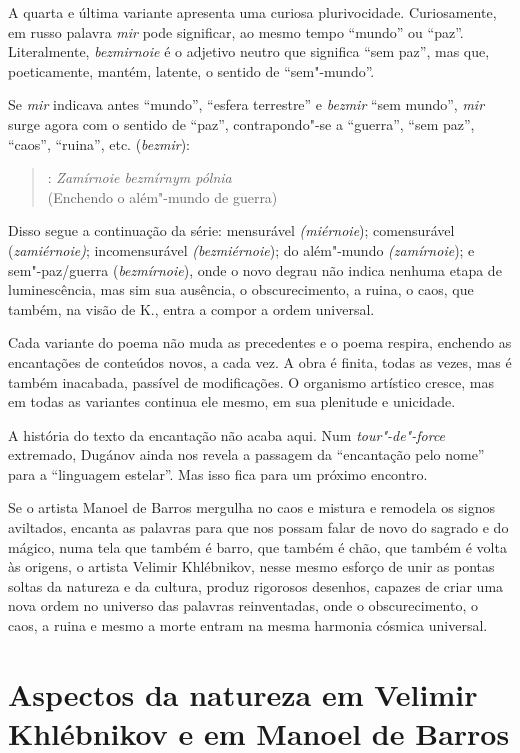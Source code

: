 A quarta e última variante apresenta uma curiosa plurivocidade.
Curiosamente, em russo palavra \emph{mir} pode significar, ao mesmo
tempo ``mundo'' ou ``paz''. Literalmente, \emph{bezmirnoie} é o adjetivo
neutro que significa ``sem paz'', mas que, poeticamente, mantém,
latente, o sentido de ``sem"-mundo''.

Se \emph{mir} indicava antes ``mundo'', ``esfera terrestre'' e
\emph{bezmir} ``sem mundo'', \emph{mir} surge agora com o sentido de
``paz'', contrapondo"-se a ``guerra'', ``sem paz'', ``caos'', ``ruina'',
etc. (\emph{bezmir}):

\begin{verse}
: \emph{Zamírnoie bezmírnym pólnia} \\
(Enchendo o além"-mundo de guerra)
\end{verse}

Disso segue a continuação da série: mensurável \emph{(miérnoie});
comensurável (\emph{zamiérnoie)}; incomensurável \emph{(bezmiérnoie});
do além"-mundo \emph{(zamírnoie}); e sem"-paz/guerra (\emph{bezmírnoie}),
onde o novo degrau não indica nenhuma etapa de luminescência, mas sim
sua ausência, o obscurecimento, a ruina, o caos, que também, na visão de
K., entra a compor a ordem universal.

Cada variante do poema não muda as precedentes e o poema respira,
enchendo as encantações de conteúdos novos, a cada vez. A obra é finita,
todas as vezes, mas é também inacabada, passível de modificações. O
organismo artístico cresce, mas em todas as variantes continua ele
mesmo, em sua plenitude e unicidade.

A história do texto da encantação não acaba aqui. Num
\emph{tour"-de"-force} extremado, Dugánov ainda nos revela a passagem da
``encantação pelo nome'' para a ``linguagem estelar''. Mas isso fica
para um próximo encontro.

Se o artista Manoel de Barros mergulha no caos e mistura e remodela os
signos aviltados, encanta as palavras para que nos possam falar de novo
do sagrado e do mágico, numa tela que também é barro, que também é chão,
que também é volta às origens, o artista Velimir Khlébnikov, nesse mesmo
esforço de unir as pontas soltas da natureza e da cultura, produz
rigorosos desenhos, capazes de criar uma nova ordem no universo das
palavras reinventadas, onde o obscurecimento, o caos, a ruina e mesmo a
morte entram na mesma harmonia cósmica universal.

\chapter*{Aspectos da natureza em Velimir Khlébnikov e em Manoel de Barros}


